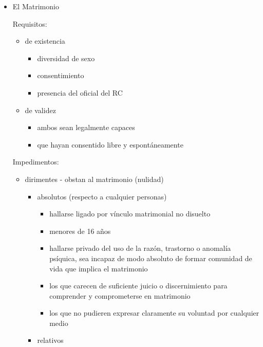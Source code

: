 \documentclass[]{article}
\providecommand{\tightlist}{%
  \setlength{\itemsep}{0pt}\setlength{\parskip}{0pt}}
\begin{document}
\begin{itemize}
\item
  El Matrimonio

  Requisitos:

  \begin{itemize}
  \tightlist
  \item
    de existencia

    \begin{itemize}
    \tightlist
    \item
      diversidad de sexo
    \item
      consentimiento
    \item
      presencia del oficial del RC
    \end{itemize}
  \item
    de validez

    \begin{itemize}
    \tightlist
    \item
      ambos sean legalmente capaces
    \item
      que hayan consentido libre y espontáneamente
    \end{itemize}
  \end{itemize}

  Impedimentos:

  \begin{itemize}
  \tightlist
  \item
    dirimentes - obstan al matrimonio (nulidad)

    \begin{itemize}
    \tightlist
    \item
      absolutos (respecto a cualquier personas)

      \begin{itemize}
      \tightlist
      \item
        hallarse ligado por vínculo matrimonial no disuelto
      \item
        menores de 16 años
      \item
        hallarse privado del uso de la razón, trastorno o anomalía
        psíquica, sea incapaz de modo absoluto de formar comunidad de
        vida que implica el matrimonio
      \item
        los que carecen de suficiente juicio o discernimiento para
        comprender y comprometerse en matrimonio
      \item
        los que no pudieren expresar claramente su voluntad por
        cualquier medio
      \end{itemize}
    \item
      relativos


\end{itemize}
\end{itemize}
\end{itemize}
\end{document}
